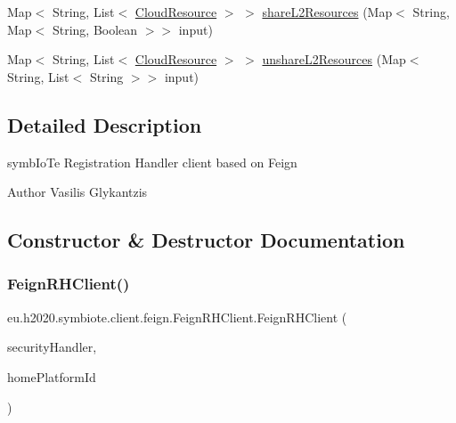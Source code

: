 \begin{DoxyCompactItemize}
\item 
Map$<$ String, List$<$ \hyperlink{classeu_1_1h2020_1_1symbiote_1_1cloud_1_1model_1_1internal_1_1CloudResource}{Cloud\+Resource} $>$ $>$ \hyperlink{classeu_1_1h2020_1_1symbiote_1_1client_1_1feign_1_1FeignRHClient_a2ad028004364f0068c760134a25956b0}{share\+L2\+Resources} (Map$<$ String, Map$<$ String, Boolean $>$$>$ input)
\item 
Map$<$ String, List$<$ \hyperlink{classeu_1_1h2020_1_1symbiote_1_1cloud_1_1model_1_1internal_1_1CloudResource}{Cloud\+Resource} $>$ $>$ \hyperlink{classeu_1_1h2020_1_1symbiote_1_1client_1_1feign_1_1FeignRHClient_aaac584d86c2d5c63dbfe1a367fc3bd24}{unshare\+L2\+Resources} (Map$<$ String, List$<$ String $>$$>$ input)
\end{DoxyCompactItemize}


\subsection{Detailed Description}
symb\+Io\+Te Registration Handler client based on Feign

\begin{DoxyAuthor}{Author}
Vasilis Glykantzis 
\end{DoxyAuthor}


\subsection{Constructor \& Destructor Documentation}
\mbox{\label{classeu_1_1h2020_1_1symbiote_1_1client_1_1feign_1_1FeignRHClient_a7c8c876847e4cb50716115669056b2aa}} 
\subsubsection{\texorpdfstring{Feign\+R\+H\+Client()}{FeignRHClient()}}
{\footnotesize\ttfamily eu.\+h2020.\+symbiote.\+client.\+feign.\+Feign\+R\+H\+Client.\+Feign\+R\+H\+Client (\begin{DoxyParamCaption}\item[{I\+Security\+Handler}]{security\+Handler,  }\item[{String}]{home\+Platform\+Id }\end{DoxyParamCaption})}


